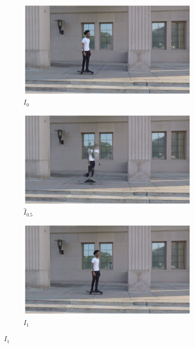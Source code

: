 \documentclass{article}
\begin{document}
\begin{figure}
\begin{subfigure}{0.33\textwidth}
\end{subfigure}
\begin{subfigure}{0.33\textwidth}
	\centering
    \includegraphics[width=1\linewidth]{nd_scene/Skating_I0.jpg}
    \caption{$I_0$}
\end{subfigure}%
\begin{subfigure}{0.33\textwidth}
	\centering
    \includegraphics[width=1\linewidth]{nd_scene/Skating_out.jpg}
    \caption{$\hat{I}_0.5$}
\end{subfigure}%
\begin{subfigure}{0.33\textwidth}
	\centering
    \includegraphics[width=1\linewidth]{nd_scene/Skating_I1.jpg}
    \caption{$I_1$}
\end{subfigure}%



\end{figure}
\end{document}
